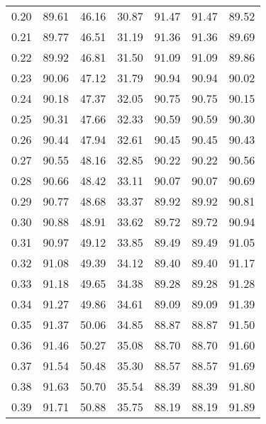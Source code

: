 \begin{tabular}{|c|c|c|c|c|c|c|}
      0.20 &     89.61 &     46.16 &      30.87 &   91.47 &      91.47 &         89.52 \\
      0.21 &     89.77 &     46.51 &      31.19 &   91.36 &      91.36 &         89.69 \\
      0.22 &     89.92 &     46.81 &      31.50 &   91.09 &      91.09 &         89.86 \\
      0.23 &     90.06 &     47.12 &      31.79 &   90.94 &      90.94 &         90.02 \\
      0.24 &     90.18 &     47.37 &      32.05 &   90.75 &      90.75 &         90.15 \\
      0.25 &     90.31 &     47.66 &      32.33 &   90.59 &      90.59 &         90.30 \\
      0.26 &     90.44 &     47.94 &      32.61 &   90.45 &      90.45 &         90.43 \\
      0.27 &     90.55 &     48.16 &      32.85 &   90.22 &      90.22 &         90.56 \\
      0.28 &     90.66 &     48.42 &      33.11 &   90.07 &      90.07 &         90.69 \\
      0.29 &     90.77 &     48.68 &      33.37 &   89.92 &      89.92 &         90.81 \\
      0.30 &     90.88 &     48.91 &      33.62 &   89.72 &      89.72 &         90.94 \\
      0.31 &     90.97 &     49.12 &      33.85 &   89.49 &      89.49 &         91.05 \\
      0.32 &     91.08 &     49.39 &      34.12 &   89.40 &      89.40 &         91.17 \\
      0.33 &     91.18 &     49.65 &      34.38 &   89.28 &      89.28 &         91.28 \\
      0.34 &     91.27 &     49.86 &      34.61 &   89.09 &      89.09 &         91.39 \\
      0.35 &     91.37 &     50.06 &      34.85 &   88.87 &      88.87 &         91.50 \\
      0.36 &     91.46 &     50.27 &      35.08 &   88.70 &      88.70 &         91.60 \\
      0.37 &     91.54 &     50.48 &      35.30 &   88.57 &      88.57 &         91.69 \\
      0.38 &     91.63 &     50.70 &      35.54 &   88.39 &      88.39 &         91.80 \\
      0.39 &     91.71 &     50.88 &      35.75 &   88.19 &      88.19 &         91.89 \\

\end{tabular}

